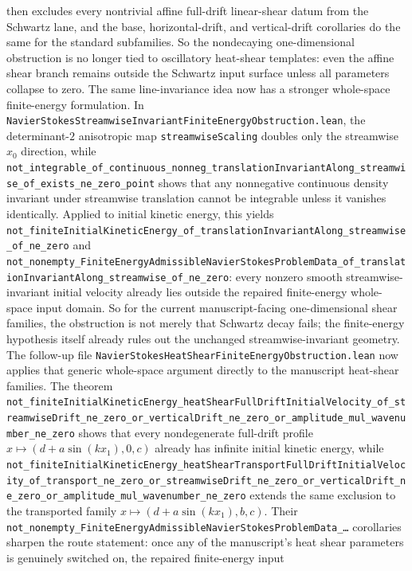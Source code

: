 \documentclass[11pt]{article}
\theoremstyle{remark}
\begin{document}
then excludes every nontrivial affine full-drift linear-shear datum from the
Schwartz lane, and the base, horizontal-drift, and vertical-drift corollaries
do the same for the standard subfamilies.  So the nondecaying one-dimensional
obstruction is no longer tied to oscillatory heat-shear templates: even the
affine shear branch remains outside the Schwartz input surface unless all
parameters collapse to zero.
The same line-invariance idea now has a stronger whole-space finite-energy
formulation.  In
\texttt{NavierStokesStreamwiseInvariantFiniteEnergyObstruction.lean}, the
determinant-\(2\) anisotropic map
\texttt{streamwiseScaling} doubles only the streamwise \(x_0\) direction, while
\texttt{not\_integrable\_of\_continuous\_nonneg\_translationInvariantAlong\_streamwise\_of\_exists\_ne\_zero\_point}
shows that any nonnegative continuous density invariant under streamwise
translation cannot be integrable unless it vanishes identically.  Applied to
initial kinetic energy, this yields
\texttt{not\_finiteInitialKineticEnergy\_of\_translationInvariantAlong\_streamwise\_of\_ne\_zero}
and
\texttt{not\_nonempty\_FiniteEnergyAdmissibleNavierStokesProblemData\_of\_translationInvariantAlong\_streamwise\_of\_ne\_zero}:
every nonzero smooth streamwise-invariant initial velocity already lies outside
the repaired finite-energy whole-space input domain.  So for the current
manuscript-facing one-dimensional shear families, the obstruction is not merely
that Schwartz decay fails; the finite-energy hypothesis itself already rules
out the unchanged streamwise-invariant geometry.
The follow-up file
\texttt{NavierStokesHeatShearFiniteEnergyObstruction.lean} now applies that
generic whole-space argument directly to the manuscript heat-shear families.
The theorem
\texttt{not\_finiteInitialKineticEnergy\_heatShearFullDriftInitialVelocity\_of\_streamwiseDrift\_ne\_zero\_or\_verticalDrift\_ne\_zero\_or\_amplitude\_mul\_wavenumber\_ne\_zero}
shows that every nondegenerate full-drift profile
\(x \mapsto (d + a \sin(kx_1),0,c)\) already has infinite initial kinetic
energy, while
\texttt{not\_finiteInitialKineticEnergy\_heatShearTransportFullDriftInitialVelocity\_of\_transport\_ne\_zero\_or\_streamwiseDrift\_ne\_zero\_or\_verticalDrift\_ne\_zero\_or\_amplitude\_mul\_wavenumber\_ne\_zero}
extends the same exclusion to the transported family
\(x \mapsto (d + a \sin(kx_1),b,c)\).  Their
\texttt{not\_nonempty\_FiniteEnergyAdmissibleNavierStokesProblemData\_\dots}
corollaries sharpen the route statement: once any of the manuscript's heat
shear parameters is genuinely switched on, the repaired finite-energy input
\end{document}

